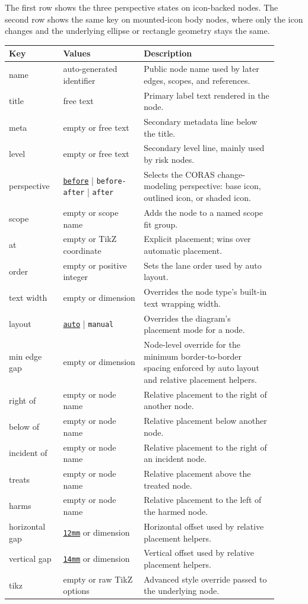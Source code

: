 \documentclass[a4paper]{article}
\newcommand{\keydefault}[1]{\underline{\texttt{#1}}}
\begin{document}
\noindent
The first row shows the three perspective states on icon-backed nodes. The
second row shows the same key on mounted-icon body nodes, where only the icon
changes and the underlying ellipse or rectangle geometry stays the same.

\begin{center}
\begin{tabular}{>{\ttfamily}p{0.18\linewidth}p{0.27\linewidth}p{0.45\linewidth}}
\hline
Key & Values & Description \\
\hline
name & auto-generated identifier & Public node name used by later edges, scopes, and references. \\
title & free text & Primary label text rendered in the node. \\
meta & empty or free text & Secondary metadata line below the title. \\
level & empty or free text & Secondary level line, mainly used by risk nodes. \\
perspective & \keydefault{before} | \texttt{before-after} | \texttt{after} & Selects the CORAS change-modeling perspective: base icon, outlined icon, or shaded icon. \\
scope & empty or scope name & Adds the node to a named scope fit group. \\
at & empty or TikZ coordinate & Explicit placement; wins over automatic placement. \\
order & empty or positive integer & Sets the lane order used by auto layout. \\
text width & empty or dimension & Overrides the node type's built-in text wrapping width. \\
layout & \keydefault{auto} | \texttt{manual} & Overrides the diagram's placement mode for a node. \\
min edge gap & empty or dimension & Node-level override for the minimum border-to-border spacing enforced by auto layout and relative placement helpers. \\
right of & empty or node name & Relative placement to the right of another node. \\
below of & empty or node name & Relative placement below another node. \\
incident of & empty or node name & Relative placement to the right of an incident node. \\
treats & empty or node name & Relative placement above the treated node. \\
harms & empty or node name & Relative placement to the left of the harmed node. \\
horizontal gap & \keydefault{12mm} or dimension & Horizontal offset used by relative placement helpers. \\
vertical gap & \keydefault{14mm} or dimension & Vertical offset used by relative placement helpers. \\
tikz & empty or raw TikZ options & Advanced style override passed to the underlying node. \\
\hline
\end{tabular}
\end{center}
\end{document}
